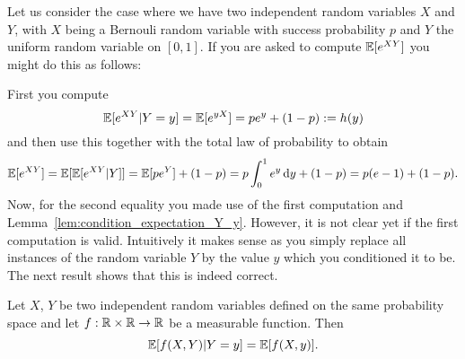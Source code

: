 Let us consider the case where we have two independent random variables $X$ and $Y$, with $X$ being a Bernouli random variable with success probability $p$ and $Y$ the uniform random variable on $[0,1]$. If you are asked to compute $\mathbb E[e^{XY}]$ you might do this as follows:

First you compute
\[
	\mathbb E[e^{XY} | Y = y] = \mathbb E[e^{yX}] = pe^{y} + (1-p) := h(y)
\]
and then use this together with the total law of probability to obtain
\[
	\mathbb E[e^{XY}] = \mathbb E[\mathbb E[e^{XY}|Y]] = \mathbb E[pe^Y] + (1-p) = p \int_0^1 e^{y} \, \mathrm{d} y + (1-p)
	= p(e - 1) + (1-p).
\]
Now, for the second equality you made use of the first computation and Lemma~\ref{lem:condition_expectation_Y_y}. However, it is not clear yet if the first computation is valid. Intuitively it makes sense as you simply replace all instances of the random variable $Y$ by the value $y$ which you conditioned it to be. The next result shows that this is indeed correct.

\begin{lemma}\label{lem:computing_conditional_expectations}
Let $X$, $Y$ be two independent random variables defined on the same probability space and let $f : \mathbb R \times \mathbb R \to \mathbb R$ be a measurable function. Then
\[
	\mathbb E[f(X,Y) | Y = y] = \mathbb E[f(X,y)].
\]
\end{lemma}

